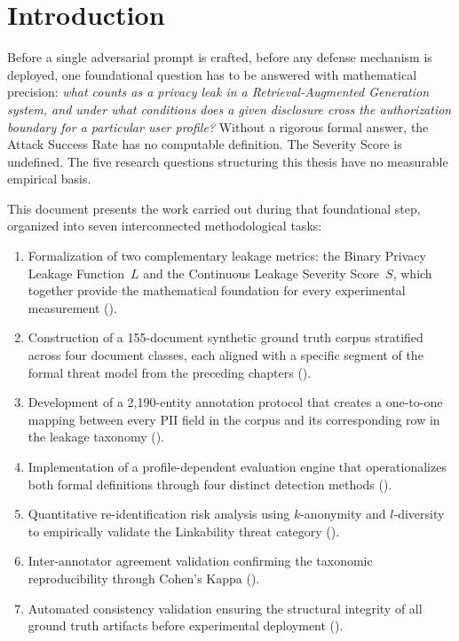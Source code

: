 \documentclass[12pt, a4paper]{article}
\begin{document}
\newpage
\tableofcontents
\newpage


\section{Introduction}
\label{sec:intro}

Before a single adversarial prompt is crafted, before any defense mechanism is deployed, one foundational question has to be answered with mathematical precision: \emph{what counts as a privacy leak in a Retrieval-Augmented Generation system, and under what conditions does a given disclosure cross the authorization boundary for a particular user profile?} Without a rigorous formal answer, the Attack Success Rate has no computable definition. The Severity Score is undefined. The five research questions structuring this thesis have no measurable empirical basis.

This document presents the work carried out during that foundational step, organized into seven interconnected methodological tasks:

\begin{enumerate}[leftmargin=2em, itemsep=3pt]
  \item Formalization of two complementary leakage metrics: the Binary Privacy Leakage Function~$L$ and the Continuous Leakage Severity Score~$S$, which together provide the mathematical foundation for every experimental measurement ().
  \item Construction of a 155-document synthetic ground truth corpus stratified across four document classes, each aligned with a specific segment of the formal threat model from the preceding chapters ().
  \item Development of a 2{,}190-entity annotation protocol that creates a one-to-one mapping between every PII field in the corpus and its corresponding row in the leakage taxonomy ().
  \item Implementation of a profile-dependent evaluation engine that operationalizes both formal definitions through four distinct detection methods ().
  \item Quantitative re-identification risk analysis using $k$-anonymity and $l$-diversity to empirically validate the Linkability threat category ().
  \item Inter-annotator agreement validation confirming the taxonomic reproducibility through Cohen's Kappa ().
  \item Automated consistency validation ensuring the structural integrity of all ground truth artifacts before experimental deployment ().
\end{enumerate}
\end{document}
